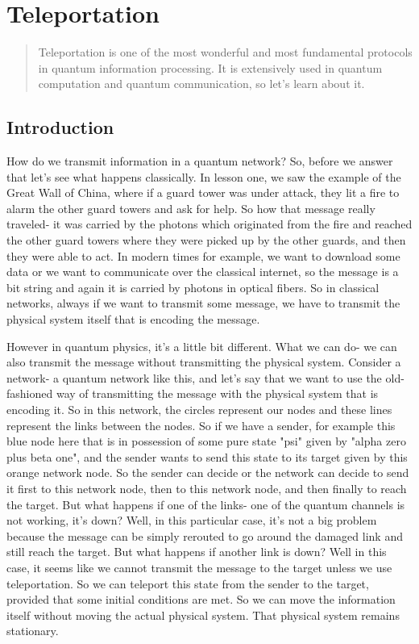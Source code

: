 \chapter{Teleportation}

\begin{abstract}

Teleportation is one of the most wonderful and most fundamental protocols in quantum information processing. It is extensively used in quantum computation and quantum communication, so let's learn about it.
\end{abstract}

\section{Introduction}


How do we transmit information in a quantum network? So, before we answer that let's see what happens classically. In lesson one, we saw the example of the Great Wall of China, where if a guard tower was under attack, they lit a fire to alarm the other guard towers and ask for help. So how that message really traveled- it was carried by the photons which originated from the fire and reached the other guard towers where they were picked up by the other guards, and then they were able to act. In modern times for example, we want to download some data or we want to communicate over the classical internet, so the message is a bit string and again it is carried by photons in optical fibers. So in classical networks, always if we want to transmit some message, we have to transmit the physical system itself that is encoding the message. 

However in quantum physics, it's a little bit different. What we can do- we can also transmit the message without transmitting the physical system. Consider a network- a quantum network like this, and let's say that we want to use the old-fashioned way of transmitting the message with the physical system that is encoding it. So in this network, the circles represent our nodes and these lines represent the links between the nodes. So if we have a sender, for example this blue node here that is in possession of some pure state "psi" given by "alpha zero plus beta one", and the sender wants to send this state to its target given by this orange network node. So the sender can decide or the network can decide to send it first to this network node, then to this network node, and then finally to reach the target. But what happens if one of the links- one of the quantum channels is not working, it's down? Well, in this particular case, it's not a big problem because the message can be simply rerouted to go around the damaged link and still reach the target. But what happens if another link is down? Well in this case, it seems like we cannot transmit the message to the target unless we use teleportation. So we can teleport this state from the sender to the target, provided that some initial conditions are met. So we can move the information itself without moving the actual physical system. That physical system remains stationary.


